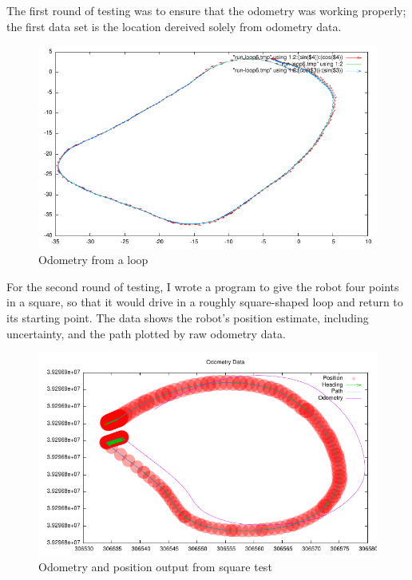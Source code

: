The first round of testing was to ensure that the odometry was working properly; the first data set is the location dereived solely from odometry data.

\begin{figure}
\includegraphics{run-loop6}
\caption{Odometry from a loop}
\end{figure}

For the second round of testing, I wrote a program to give the robot four points in a square, so that it would drive in a roughly square-shaped loop and return to its starting point. The data shows the robot's position estimate, including uncertainty, and the path plotted by raw odometry data.

\begin{figure}
\includegraphics{run-2011-05-30-3}
\caption{Odometry and position output from square test}
\end{figure}



